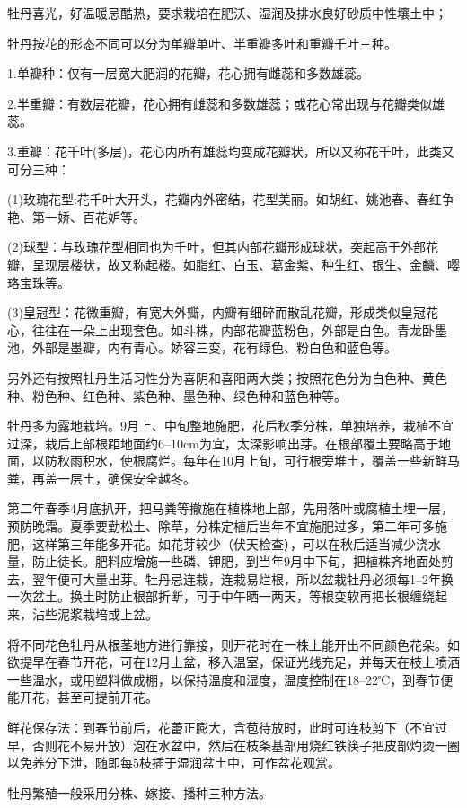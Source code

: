 \documentclass{ctexbook}
\begin{document}
牡丹喜光，好温暖忌酷热，要求栽培在肥沃、湿润及排水良好砂质中性壤土中；

牡丹按花的形态不同可以分为单瓣单叶、半重瓣多叶和重瓣千叶三种。

1.单瓣种：仅有一层宽大肥润的花瓣，花心拥有雌蕊和多数雄蕊。

2.半重瓣：有数层花瓣，花心拥有雌蕊和多数雄蕊；或花心常出现与花瓣类似雄蕊。

3.重瓣：花千叶(多层)，花心内所有雄蕊均变成花瓣状，所以又称花千叶，此类又可分三种：

(1)玫瑰花型:花千叶大开头，花瓣内外密结，花型美丽。如胡红、姚池春、春红争艳、第一娇、百花妒等。

(2)球型：与玫瑰花型相同也为千叶，但其内部花瓣形成球状，突起高于外部花瓣，呈现层楼状，故又称起楼。如脂红、白玉、葛金紫、种生红、银生、金麟、嘤珞宝珠等。

(3)皇冠型：花微重瓣，有宽大外瓣，内瓣有细碎而散乱花瓣，形成类似皇冠花心，往往在一朵上出现套色。如斗株，内部花瓣蓝粉色，外部是白色。青龙卧墨池，外部是墨瓣，内有青心。娇容三变，花有绿色、粉白色和蓝色等。

另外还有按照牡丹生活习性分为喜阴和喜阳两大类；按照花色分为白色种、黄色种、粉色种、红色种、紫色种、墨色种、绿色种和蓝色种等。

牡丹多为露地栽培。9月上、中旬整地施肥，花后秋季分株，单独培养，栽植不宜过深，栽后上部根距地面约6--10cm为宜，太深影响出芽。在根部覆土要略高于地面，以防秋雨积水，使根腐烂。每年在10月上旬，可行根旁堆土，覆盖一些新鲜马粪，再盖一层土，确保安全越冬。

第二年春季4月底扒开，把马粪等撤施在植株地上部，先用落叶或腐植土埋一层，预防晚霜。夏季要勤松土、除草，分株定植后当年不宜施肥过多，第二年可多施肥，这样第三年能多开花。如花芽较少（伏天检查），可以在秋后适当减少浇水量，防止徒长。肥料应增施一些磷、钾肥，到当年9月中下旬，把植株齐地面处剪去，翌年便可大量出芽。牡丹忌连栽，连栽易烂根，所以盆栽牡丹必须每1--2年换一次盆土。换土时防止根部折断，可于中午晒一两天，等根变软再把长根缠绕起来，沾些泥浆栽培或上盆。

将不同花色牡丹从根茎地方进行靠接，则开花时在一株上能开出不同颜色花朵。如欲提早在春节开花，可在12月上盆，移入温室，保证光线充足，并每天在枝上喷洒一些温水，或用塑料做成棚，以保持温度和湿度，温度控制在18--22℃，到春节便能开花，甚至可提前开花。

鲜花保存法：到春节前后，花蕾正膨大，含苞待放时，此时可连枝剪下（不宜过早，否则花不易开放）泡在水盆中，然后在枝条基部用烧红铁筷子把皮部灼烫一圈以免养分下泄，随即每5枝插于湿润盆土中，可作盆花观赏。

牡丹繁殖一般采用分株、嫁接、播种三种方法。
\end{document}
